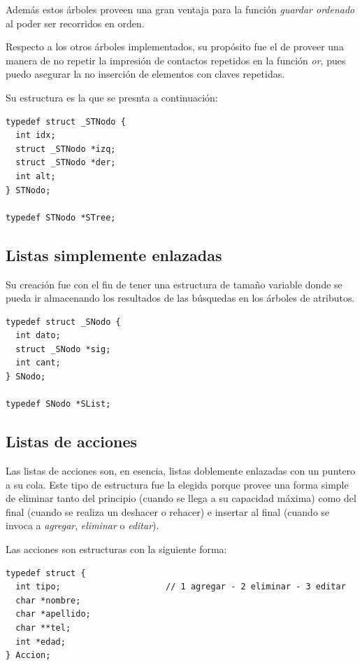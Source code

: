 \documentclass[11pt]{article}
\begin{document}
Adem\'as estos \'arboles proveen una gran ventaja para la funci\'on \emph{guardar ordenado} al poder ser recorridos en orden.

Respecto a los otros \'arboles implementados, su prop\'osito fue el de proveer una manera de no repetir la impresi\'on de contactos repetidos en la funci\'on \emph{or}, 
pues puedo asegurar la no inserci\'on de elementos con claves repetidas. 

Su estructura es la que se presnta a continuaci\'on:

\begin{lstlisting}[style = CStyle]
typedef struct _STNodo {
  int idx;
  struct _STNodo *izq;
  struct _STNodo *der;
  int alt;
} STNodo;

typedef STNodo *STree;
\end{lstlisting}

\vspace{1cm}

\subsection{Listas simplemente enlazadas}

Su creaci\'on fue con el fin de tener una estructura de tamaño variable donde se pueda ir almacenando los resultados de las b\'usquedas en los \'arboles de atributos.

\begin{lstlisting}[style = CStyle]
typedef struct _SNodo {
  int dato;
  struct _SNodo *sig;
  int cant;
} SNodo;

typedef SNodo *SList;
\end{lstlisting}

\subsection{Listas de acciones}
Las listas de acciones son, en esencia, listas doblemente enlazadas con un puntero a su cola. 
Este tipo de estructura fue la elegida porque provee una forma simple de eliminar tanto del principio (cuando se llega a su capacidad m\'axima) como del final (cuando se realiza un deshacer o rehacer)
e insertar al final (cuando se invoca a \emph{agregar}, \emph{eliminar} o \emph{editar}).

Las acciones son estructuras con la siguiente forma: 

\begin{lstlisting}[style = CStyle]
typedef struct {
  int tipo;                     // 1 agregar - 2 eliminar - 3 editar 
  char *nombre;
  char *apellido;
  char **tel;
  int *edad;
} Accion;
\end{lstlisting}
\end{document}
